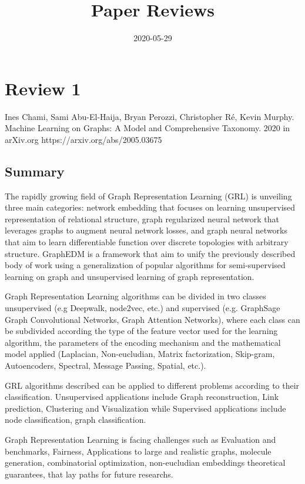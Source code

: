 \documentclass{article}
\begin{document}
\title{Paper Reviews}
\date{2020-05-29}
\maketitle

\section*{Review 1}
Ines Chami, Sami Abu-El-Haija, Bryan Perozzi, Christopher Ré, Kevin Murphy.
Machine Learning on Graphs: A Model and Comprehensive Taxonomy.
2020 in arXiv.org https://arxiv.org/abs/2005.03675

\subsection*{Summary}

The rapidly growing field of Graph Representation Learning (GRL) is unveiling
three main categories: network embedding that focuses on learning unsupervised
representation of relational structure, graph regularized neural network that
leverages graphs to augment neural network losses, and graph neural networks
that aim to learn differentiable function over discrete topologies with
arbitrary structure. GraphEDM is a framework that aim to unify the previously
described body of work using a generalization of popular algorithms for
semi-supervised learning on graph and unsupervised learning of graph
representation. 

Graph Representation Learning algorithms can be divided in two classes
unsupervised (e.g Deepwalk, node2vec, etc.) and supervised (e.g. GraphSage
Graph Convolutional Networks, Graph Attention Networks), where each class
can be subdivided according the type of the feature vector used for the
learning algorithm, the parameters of the encoding mechanism and the
mathematical model applied (Laplacian, Non-eucludian, Matrix factorization,
Skip-gram, Autoencoders, Spectral, Message Passing, Spatial, etc.). 

GRL algorithms described can be applied to different problems according
to their classification. Unsupervised applications include Graph
reconstruction, Link prediction, Clustering and Visualization while
Supervised applications include node classification, graph classification. 

Graph Representation Learning is facing challenges such as Evaluation and
benchmarks, Fairness, Applications to large and realistic graphs, molecule
generation, combinatorial optimization, non-eucludian embeddings theoretical
guarantees, that lay paths for future researchs. 
\end{document}
